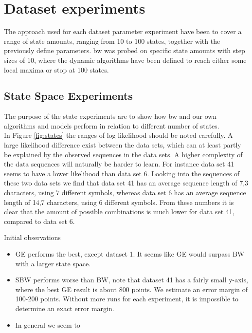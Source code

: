 
\section{Dataset experiments}
The approach used for each dataset parameter experiment have been to cover a range of state amounts, ranging from 10 to 100 states, together with the previously define parameters. \gls{bw} was probed on specific state amounts with step sizes of 10, where the dynamic algorithms have been defined to reach either some local maxima or stop at 100 states.

\subsection{State Space Experiments}

The purpose of the state experiments are to show how \gls{bw} and our own algorithms and models perform in relation to different number of states.\\

	

In Figure \ref{fig:states} the ranges of log likelihood should be noted carefully. A large likelihood difference exist between the data sets, which can at least partly be explained by the observed sequences in the data sets. A higher complexity of the data sequences will naturally be harder to learn. For instance data set 41 seems to have a lower likelihood than data set 6. Looking into the sequences of these two data sets we find that data set 41 has an average sequence length of 7,3 characters, using 7 different symbols, whereas data set 6 has an average sequence length of 14,7 characters, using 6 different symbols. From these numbers it is clear that the amount of possible combinations is much lower for data set 41, compared to data set 6.




Initial observations
\begin{itemize}
\item GE performs the best, except dataset 1. It seems like GE would surpass BW with a larger state space.
\item SBW performs worse than BW, note that dataset 41 has a fairly small y-axis, where the best GE result is about 800 points. We estimate an error margin of 100-200 points. Without more runs for each experiment, it is impossible to determine an exact error margin.
\item In general we seem to 
\end{itemize}


